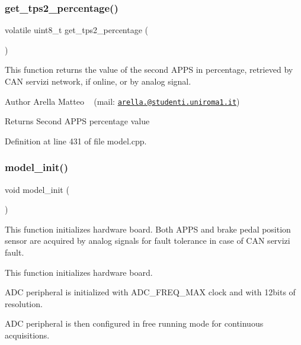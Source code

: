 \subsubsection{\texorpdfstring{get\+\_\+tps2\+\_\+percentage()}{get\_tps2\_percentage()}}
{\footnotesize\ttfamily volatile uint8\+\_\+t get\+\_\+tps2\+\_\+percentage (\begin{DoxyParamCaption}{ }\end{DoxyParamCaption})}



This function returns the value of the second A\+P\+PS in percentage, retrieved by C\+AN servizi network, if online, or by analog signal. 

\begin{DoxyAuthor}{Author}
Arella Matteo ~\newline
 (mail\+: \href{mailto:arella.1646983@studenti.uniroma1.it}{\tt arella.@studenti.\+uniroma1.\+it})
\end{DoxyAuthor}
\begin{DoxyReturn}{Returns}
Second A\+P\+PS percentage value 
\end{DoxyReturn}


Definition at line 431 of file model.\+cpp.

\mbox{\label{group___board__model__group_gace5a444da39d4366693503c53f0841c2}} 
\subsubsection{\texorpdfstring{model\+\_\+init()}{model\_init()}}
{\footnotesize\ttfamily void model\+\_\+init (\begin{DoxyParamCaption}{ }\end{DoxyParamCaption})}



This function initializes hardware board. Both A\+P\+PS and brake pedal position sensor are acquired by analog signals for fault tolerance in case of C\+AN servizi fault. 

This function initializes hardware board.

A\+DC peripheral is initialized with A\+D\+C\+\_\+\+F\+R\+E\+Q\+\_\+\+M\+AX clock and with 12bits of resolution.

A\+DC peripheral is then configured in free running mode for continuous acquisitions.

